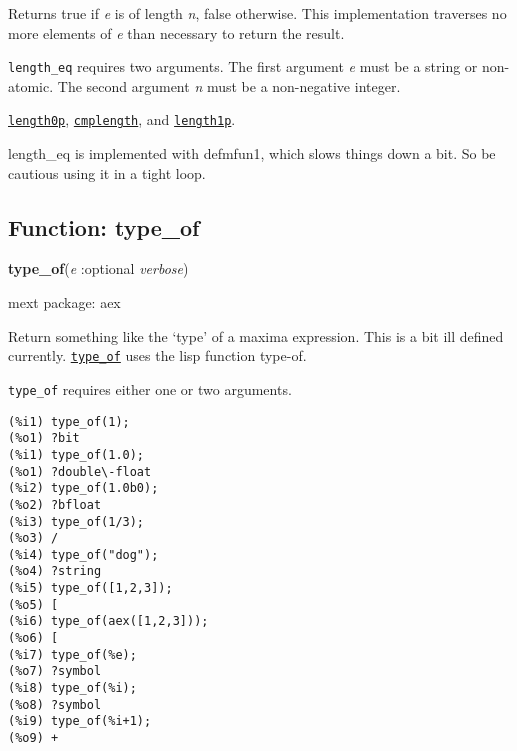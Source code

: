 \documentclass[]{article}
\begin{document}
\vspace{5 pt}
Returns true if {\it e} is of length {\it n}, false otherwise. This implementation traverses no more elements of {\it e} than necessary to return the result. 

\vspace{5 pt}

   {\tt length\_eq} requires two arguments.
    The first argument {\it e} must be a string or non-atomic.
    The second argument {\it n} must be a non-negative integer.


\vspace{5 pt}


  \hyperlink{length0p}{{\tt length0p}}, \hyperlink{cmplength}{{\tt cmplength}}, and \hyperlink{length1p}{{\tt length1p}}.

\vspace{5 pt}


length\_eq is implemented with defmfun1, which slows things down a bit. So be cautious using it in a tight loop. 

\vspace{5 pt}


\subsection{Function: type\_of\label{sec:type_of}}
\hypertarget{type_of}{}
{\bf type\_of}({\it e} :optional {\it verbose})


\noindent mext package: aex



\vspace{5 pt}
Return something like the `type' of a maxima expression. This is a bit ill defined currently. \hyperlink{type_of}{{\tt type\_of}} uses the lisp function type-of. 

\vspace{5 pt}

   {\tt type\_of} requires either one or two arguments.


\vspace{5 pt}


\begin{Verbatim}[frame=single]
(%i1) type_of(1);
(%o1) ?bit
(%i1) type_of(1.0);
(%o1) ?double\-float
(%i2) type_of(1.0b0);
(%o2) ?bfloat
(%i3) type_of(1/3);
(%o3) /
(%i4) type_of("dog");
(%o4) ?string
(%i5) type_of([1,2,3]);
(%o5) [
(%i6) type_of(aex([1,2,3]));
(%o6) [
(%i7) type_of(%e);
(%o7) ?symbol
(%i8) type_of(%i);
(%o8) ?symbol
(%i9) type_of(%i+1);
(%o9) +
\end{Verbatim}
\end{document}
